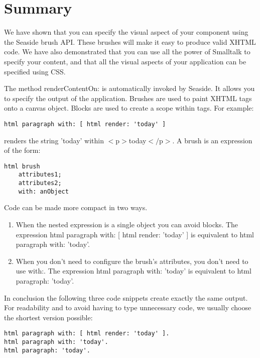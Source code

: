\documentclass[a4paper,10pt,twoside]{book}
\newcommand{\ct}[1]{{\small\ttfamily\textup{#1}}}
\begin{document}
\section{Summary}
\label{book:fundamentals:renderingcomponents:summary}

We have shown that you can specify the visual aspect of your component using the Seaside brush API.  These brushes will make it easy to produce valid XHTML code. We have also demonstrated that you can use all the power of Smalltalk to specify your content, and that all the visual aspects of your application can be specified using CSS.

The method \ct{renderContentOn:} is automatically invoked by Seaside. It allows you to specify the output of the application. Brushes are used to paint XHTML tags onto a canvas object. Blocks are used to create a scope within tags. For example:

\begin{lstlisting}
html paragraph with: [ html render: 'today' ]
\end{lstlisting}

renders the string 'today' within \ct{$<$p$>$today$<$$/$p$>$}. A brush is an expression of the form:

\begin{lstlisting}
html brush 
    attributes1; 
    attributes2;
    with: anObject
\end{lstlisting}

Code can be made more compact in two ways.

\begin{enumerate}
\item  When the nested expression is a single object you can avoid blocks. The expression \ct{html paragraph with: {[} html render: 'today' {]}} is equivalent to \ct{html paragraph with: 'today'}.
\item  When you don't need to configure the brush's attributes, you don't need to use \ct{with:}. The expression \ct{html paragraph with: 'today'} is equivalent to \ct{html paragraph: 'today'}.
\end{enumerate}

In conclusion the following three code snippets create exactly the same output. For readability and to avoid having to type unnecessary code, we usually choose the shortest version possible:

\begin{lstlisting}
html paragraph with: [ html render: 'today' ].
html paragraph with: 'today'.
html paragraph: 'today'.
\end{lstlisting}
\end{document}
